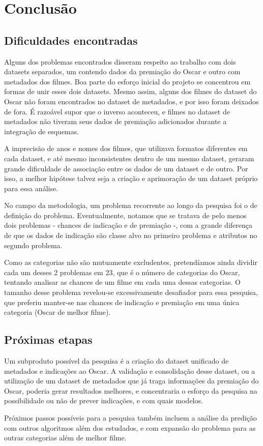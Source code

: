 \chapter[Conclusão]{Conclusão}
    \section[Dificuldades encontradas]{Dificuldades encontradas}

        Alguns dos problemas encontrados disseram respeito ao trabalho com dois datasets separados, um contendo dados da premiação do Oscar e outro com metadados dos filmes. Boa parte do esforço inicial do projeto se concentrou em formas de unir esses dois datasets. Mesmo assim, alguns dos filmes do dataset do Oscar não foram encontrados no dataset de metadados, e por isso foram deixados de fora. É razoável supor que o inverso aconteceu, e filmes no dataset de metadados não tiveram seus dados de premiação adicionados durante a integração de esquemas.
        
        A imprecisão de anos e nomes dos filmes, que utilizava formatos diferentes em cada dataset, e até mesmo inconsistentes dentro de um mesmo dataset, geraram grande dificuldade de associação entre os dados de um dataset e de outro. Por isso, a melhor hipótese talvez seja a criação e aprimoração de um dataset próprio para essa análise.
        
        No campo da metodologia, um problema recorrente ao longo da pesquisa foi o de definição do problema. Eventualmente, notamos que se tratava de pelo menos dois problemas - chances de indicação e de premiação -, com a grande diferença de que os dados de indicação são classe alvo no primeiro problema e atributos no segundo problema.
        
        Como as categorias não são mutuamente excludentes, pretendíamos ainda dividir cada um desses 2 problemas em 23, que é o número de categorias do Oscar, tentando analisar as chances de um filme em cada uma dessas categorias. O tamanho desse problema revelou-se excessivamente desafiador para essa pesquisa, que preferiu manter-se nas chances de indicação e premiação em uma única categoria (Oscar de melhor filme).
    
    \section[Próximas etapas da pesquisa]{Próximas etapas}
        Um subproduto possível da pesquisa é a criação do dataset unificado de metadados e indicações ao Oscar. A validação e consolidação desse dataset, ou a utilização de um dataset de metadados que já traga informações da premiação do Oscar, poderia gerar resultados melhores, e concentraria o esforço da pesquisa na possibilidade ou não de prever indicações, e com quais modelos.
        
        Próximos passos possíveis para a pesquisa também incluem a análise da predição com outros algoritmos além dos estudados, e com expansão do problema para as outras categorias além de melhor filme.